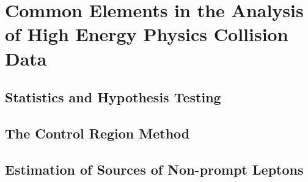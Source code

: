 \chapter{Common Elements in the Analysis of High Energy Physics Collision Data}
\label{chap:common_search}

\section{Statistics and Hypothesis Testing}

\section{The Control Region Method}

\section{Estimation of Sources of Non-prompt Leptons}
